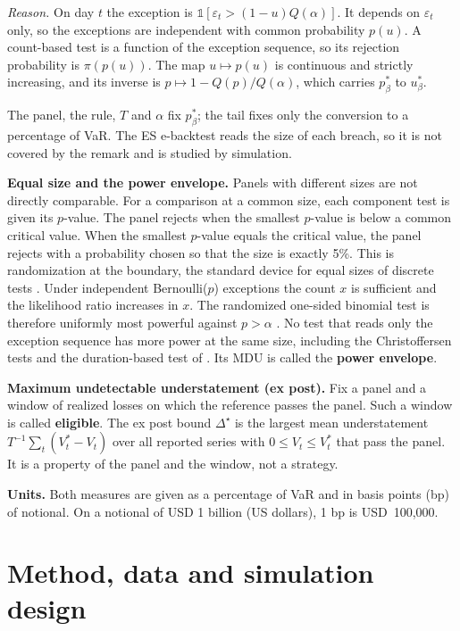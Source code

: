 \documentclass[11pt]{article}
\begin{document}
\textit{Reason.}
On day $t$ the exception is $\mathds{1}[\varepsilon_t > (1-u)Q(\alpha)]$. It
depends on $\varepsilon_t$ only, so the exceptions are independent with common
probability $p(u)$. A count-based test is a function of the exception sequence,
so its rejection probability is $\pi(p(u))$. The map $u \mapsto p(u)$ is
continuous and strictly increasing, and its inverse is $p \mapsto 1 -
Q(p)/Q(\alpha)$, which carries $p^*_\beta$ to $u^*_\beta$.

The panel, the rule, $T$ and $\alpha$ fix $p^*_\beta$; the tail fixes only the
conversion to a percentage of VaR. The ES e-backtest reads the size of each
breach, so it is not covered by the remark and is studied by simulation.

\textbf{Equal size and the power envelope.} Panels with different sizes are
not directly comparable. For a comparison at a common size, each component test
is given its $p$-value. The panel rejects when the smallest $p$-value is below
a common critical value. When the smallest $p$-value equals the critical value,
the panel rejects with a probability chosen so that the size is exactly 5\%.
This is randomization at the boundary, the standard device for equal sizes of
discrete tests \citep[Chapter~3]{lehmann2005}. Under independent
Bernoulli($p$) exceptions the count $x$ is sufficient and the likelihood ratio
increases in $x$. The randomized one-sided binomial test is therefore uniformly
most powerful against $p > \alpha$ \citep[Section~3.4]{lehmann2005}. No test
that reads only the exception sequence has more power at the same size,
including the Christoffersen tests and the duration-based test of
\citet{christoffersen2004}. Its MDU is called the
\textbf{power envelope}.

\textbf{Maximum undetectable understatement (ex post).} Fix a panel and a
window of realized losses on which the reference passes the panel. Such a
window is called \textbf{eligible}. The ex post bound $\Delta^\star$ is the
largest mean understatement $T^{-1}\sum_t (V^*_t - V_t)$ over all reported
series with $0 \le V_t \le V^*_t$ that pass the panel. It is a property of the
panel and the window, not a strategy.

\textbf{Units.} Both measures are given as a percentage of VaR and in basis
points (bp) of notional. On a notional of USD 1 billion (US dollars), 1 bp is
USD~100,000.

\section{Method, data and simulation design}
\label{sec:method}
\end{document}
